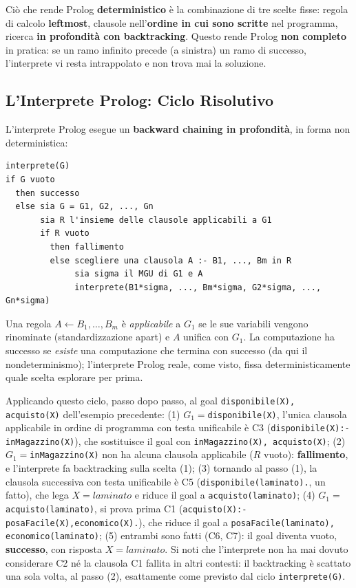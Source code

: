 \documentclass[a4paper,11pt]{article}
\begin{document}
Ciò che rende Prolog \textbf{deterministico} è la combinazione di tre scelte fisse: regola di calcolo \textbf{leftmost}, clausole nell'\textbf{ordine in cui sono scritte} nel programma, ricerca \textbf{in profondità con backtracking}. Questo rende Prolog \textbf{non completo} in pratica: se un ramo infinito precede (a sinistra) un ramo di successo, l'interprete vi resta intrappolato e non trova mai la soluzione.

\subsection{L'Interprete Prolog: Ciclo Risolutivo}

L'interprete Prolog esegue un \textbf{backward chaining in profondità}, in forma non deterministica:
\begin{lstlisting}
interprete(G)
if G vuoto
  then successo
  else sia G = G1, G2, ..., Gn
       sia R l'insieme delle clausole applicabili a G1
       if R vuoto
         then fallimento
         else scegliere una clausola A :- B1, ..., Bm in R
              sia sigma il MGU di G1 e A
              interprete(B1*sigma, ..., Bm*sigma, G2*sigma, ..., Gn*sigma)
\end{lstlisting}
Una regola $A\leftarrow B_1,\ldots,B_m$ è \emph{applicabile} a $G_1$ se le sue variabili vengono rinominate (standardizzazione apart) e $A$ unifica con $G_1$. La computazione ha successo se \emph{esiste} una computazione che termina con successo (da qui il nondeterminismo); l'interprete Prolog reale, come visto, fissa deterministicamente quale scelta esplorare per prima.

Applicando questo ciclo, passo dopo passo, al goal \texttt{disponibile(X), acquisto(X)} dell'esempio precedente: (1) $G_1=$\texttt{disponibile(X)}, l'unica clausola applicabile in ordine di programma con testa unificabile è C3 (\texttt{disponibile(X):-inMagazzino(X)}), che sostituisce il goal con \texttt{inMagazzino(X), acquisto(X)}; (2) $G_1=$\texttt{inMagazzino(X)} non ha alcuna clausola applicabile ($R$ vuoto): \textbf{fallimento}, e l'interprete fa backtracking sulla scelta (1); (3) tornando al passo (1), la clausola successiva con testa unificabile è C5 (\texttt{disponibile(laminato).}, un fatto), che lega $X{=}laminato$ e riduce il goal a \texttt{acquisto(laminato)}; (4) $G_1=$\texttt{acquisto(laminato)}, si prova prima C1 (\texttt{acquisto(X):-posaFacile(X),economico(X).}), che riduce il goal a \texttt{posaFacile(laminato), economico(laminato)}; (5) entrambi sono fatti (C6, C7): il goal diventa vuoto, \textbf{successo}, con risposta $X{=}laminato$. Si noti che l'interprete non ha mai dovuto considerare C2 né la clausola C1 fallita in altri contesti: il backtracking è scattato una sola volta, al passo (2), esattamente come previsto dal ciclo \texttt{interprete(G)}.
\end{document}
